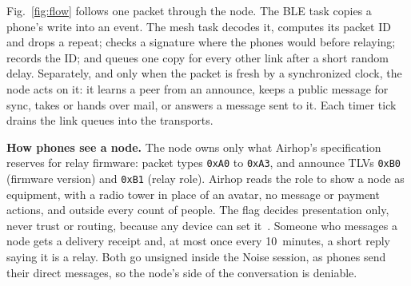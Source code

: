 \documentclass[conference]{IEEEtran}
\newcommand{\hx}[1]{\texttt{0x#1}}
\begin{document}
Fig.~\ref{fig:flow} follows one packet through the node. The BLE task copies a phone's write into an event. The mesh task decodes it, computes its packet ID and drops a repeat; checks a signature where the phones would before relaying; records the ID; and queues one copy for every other link after a short random delay. Separately, and only when the packet is fresh by a synchronized clock, the node acts on it: it learns a peer from an announce, keeps a public message for sync, takes or hands over mail, or answers a message sent to it. Each timer tick drains the link queues into the transports.

\textbf{How phones see a node.} The node owns only what Airhop's specification reserves for relay firmware: packet types \hx{A0} to \hx{A3}, and announce TLVs \hx{B0} (firmware version) and \hx{B1} (relay role). Airhop reads the role to show a node as equipment, with a radio tower in place of an avatar, no message or payment actions, and outside every count of people. The flag decides presentation only, never trust or routing, because any device can set it~\cite{airhopspec}. Someone who messages a node gets a delivery receipt and, at most once every 10~minutes, a short reply saying it is a relay. Both go unsigned inside the Noise session, as phones send their direct messages, so the node's side of the conversation is deniable.
\end{document}
